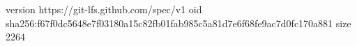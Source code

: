 version https://git-lfs.github.com/spec/v1
oid sha256:f67f0dc5648e7f03180a15c82fb01fab985c5a81d7e6f68fe9ac7d0fc170a881
size 2264
